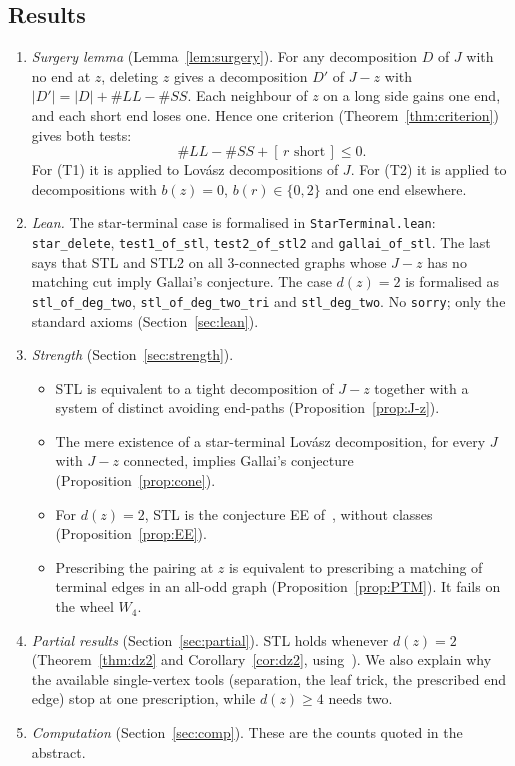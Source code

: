 \documentclass[11pt]{amsart}
\theoremstyle{definition}
\newcommand{\ind}[1]{[\,#1\,]}
\begin{document}
\subsection*{Results}
\begin{enumerate}[label=(\arabic*)]
\item \emph{Surgery lemma} (Lemma~\ref{lem:surgery}). For any decomposition $D$ of $J$ with no end
at $z$, deleting $z$ gives a decomposition $D'$ of $J-z$ with $|D'|=|D|+\#LL-\#SS$. Each
neighbour of $z$ on a long side gains one end, and each short end loses one. Hence one criterion
(Theorem~\ref{thm:criterion}) gives both tests:
$$\#LL-\#SS+\ind{r\text{ short}}\le0.$$
For (T1) it is applied to Lov\'asz decompositions of $J$. For (T2) it is applied to
decompositions with $b(z)=0$, $b(r)\in\{0,2\}$ and one end elsewhere.
\item \emph{Lean.} The star-terminal case is formalised in \texttt{StarTerminal.lean}:
\texttt{star\_delete}, \texttt{test1\_of\_stl}, \texttt{test2\_of\_stl2} and
\texttt{gallai\_of\_stl}. The last says that STL and STL2 on all $3$-connected graphs whose
$J-z$ has no matching cut imply Gallai's conjecture. The case $d(z)=2$ is formalised as
\texttt{stl\_of\_deg\_two}, \texttt{stl\_of\_deg\_two\_tri} and \texttt{stl\_deg\_two}. No
\texttt{sorry}; only the standard axioms (Section~\ref{sec:lean}).
\item \emph{Strength} (Section~\ref{sec:strength}).
  \begin{itemize}
  \item STL is equivalent to a tight decomposition of $J-z$ together with a system of distinct
  avoiding end-paths (Proposition~\ref{prop:J-z}).
  \item The mere existence of a star-terminal Lov\'asz decomposition, for every $J$ with $J-z$
  connected, implies Gallai's conjecture (Proposition~\ref{prop:cone}).
  \item For $d(z)=2$, STL is the conjecture EE of~\cite{MS}, without classes
  (Proposition~\ref{prop:EE}).
  \item Prescribing the pairing at $z$ is equivalent to prescribing a matching of terminal edges
  in an all-odd graph (Proposition~\ref{prop:PTM}). It fails on the wheel $W_4$.
  \end{itemize}
\item \emph{Partial results} (Section~\ref{sec:partial}). STL holds whenever $d(z)=2$
(Theorem~\ref{thm:dz2} and Corollary~\ref{cor:dz2}, using~\cite{PE}). We also explain why the
available single-vertex tools (separation, the leaf trick, the prescribed end edge) stop at one
prescription, while $d(z)\ge4$ needs two.
\item \emph{Computation} (Section~\ref{sec:comp}). These are the counts quoted in the abstract.
\end{enumerate}
\end{document}
